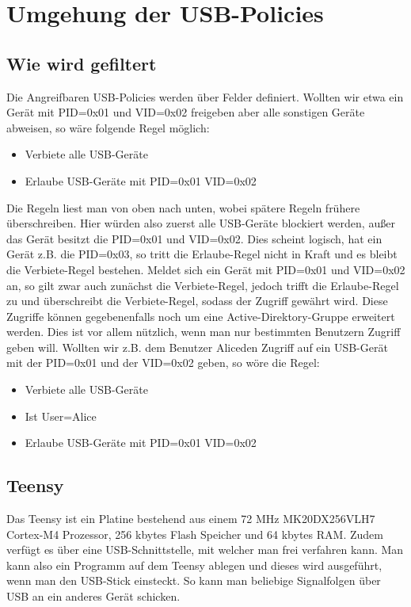 \chapter{Umgehung der USB-Policies}\label{Angriff}
			\section{Wie wird gefiltert}
Die Angreifbaren USB-Policies werden über Felder definiert. Wollten wir etwa ein Gerät mit PID=0x01 und VID=0x02 freigeben aber alle sonstigen Geräte abweisen, so wäre folgende Regel möglich:
			\begin{itemize}
				\item Verbiete alle USB-Geräte
				\item Erlaube USB-Geräte mit
					\subitem PID=0x01
					\subitem VID=0x02
			\end{itemize}
Die Regeln liest man von oben nach unten, wobei spätere Regeln frühere überschreiben. Hier würden also zuerst alle USB-Geräte blockiert werden, außer das Gerät besitzt die PID=0x01 und VID=0x02. Dies scheint logisch, hat ein Gerät z.B. die PID=0x03, so tritt die \glqq Erlaube\grqq-Regel nicht in Kraft und es bleibt die \glqq Verbiete\grqq-Regel bestehen. Meldet sich ein Gerät mit PID=0x01 und VID=0x02 an, so gilt zwar auch zunächst die \glqq Verbiete\grqq-Regel, jedoch trifft die \glqq Erlaube\grqq-Regel zu und überschreibt die \glqq Verbiete\grqq-Regel, sodass der Zugriff gewährt wird.
Diese Zugriffe können gegebenenfalls noch um eine Active-Direktory-Gruppe erweitert werden. Dies ist vor allem nützlich, wenn man nur bestimmten Benutzern Zugriff geben will. Wollten wir z.B. dem Benutzer \glqq Alice\grqq den Zugriff auf ein USB-Gerät mit der PID=0x01 und der VID=0x02 geben, so wöre die Regel:
			\begin{itemize}
				\item Verbiete alle USB-Geräte
				\item Ist User=\glqq Alice\grqq
				\item Erlaube USB-Geräte mit
					\subitem PID=0x01
					\subitem VID=0x02
			\end{itemize}
			\section{Teensy}
			Das Teensy ist ein Platine bestehend aus einem 72 MHz MK20DX256VLH7 Cortex-M4 Prozessor, 256 kbytes Flash Speicher und 64 kbytes RAM. Zudem verfügt es über eine USB-Schnittstelle, mit welcher man frei verfahren kann. Man kann also ein Programm auf dem Teensy ablegen und dieses wird ausgeführt, wenn man den USB-Stick einsteckt. So kann man beliebige Signalfolgen über USB an ein anderes Gerät schicken.
			
